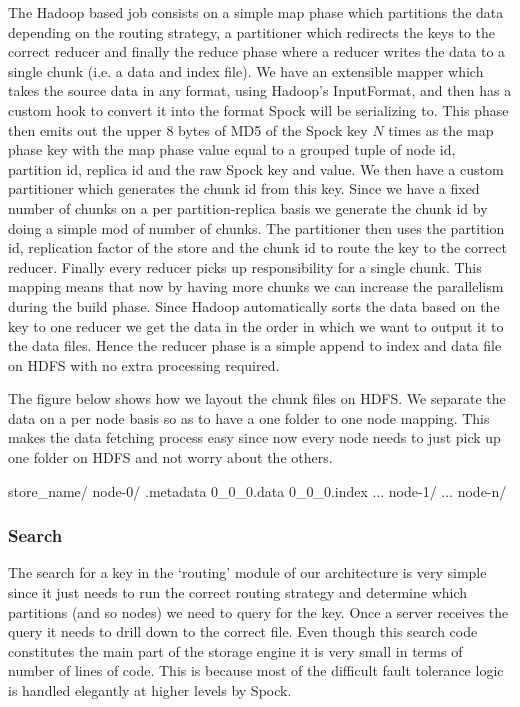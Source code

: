 \documentclass[twocolumn]{article}
\newcommand{\projectname}{Spock}
\begin{document}
The Hadoop based job consists on a simple map phase which partitions the data depending on the routing strategy, a partitioner which redirects the keys to the correct reducer and finally the reduce phase where a reducer writes the data to a single chunk (i.e. a data and index file). We have an extensible mapper which takes the source data in any format, using Hadoop's InputFormat, and then has a custom hook to convert it into the format \projectname{} will be serializing to. This phase then emits out the upper 8 bytes of MD5 of the \projectname{} key $N$ times as the map phase key with the map phase value equal to a grouped tuple of node id, partition id, replica id and the raw \projectname{} key and value. We then have a custom partitioner which generates the chunk id from this key. Since we have a fixed number of chunks on a per partition-replica basis we generate the chunk id by doing a simple mod of number of chunks. The partitioner then uses the partition id, replication factor of the store and the chunk id to route the key to the correct reducer. Finally every reducer picks up responsibility for a single chunk. This mapping means that now by having more chunks we can increase the parallelism during the build phase. Since Hadoop automatically sorts the data based on the key to one reducer we get the data in the order in which we want to output it to the data files. Hence the reducer phase is a simple append to index and data file on HDFS with no extra processing required.  

The figure below shows how we layout the chunk files on HDFS. We separate the data on a per node basis so as to have a one folder to one node mapping. This makes the data fetching process easy since now every node needs to just pick up one folder on HDFS and not worry about the others.

\scriptsize
\begin{verbatimtab}
store_name/
  node-0/
    .metadata
    0_0_0.data
    0_0_0.index
    ...
  node-1/
  ...
  node-n/
\end{verbatimtab}
\normalsize


\subsubsection{Search}
\label{sec:read_only:search}

The search for a key in the `routing' module of our architecture is very simple since it just needs to run the correct routing strategy and determine which partitions (and so nodes) we need to query for the key. Once a server receives the query it needs to drill down to the correct file. Even though this search code constitutes the main part of the storage engine it is very small in terms of number of lines of code. This is because most of the difficult fault tolerance logic is handled elegantly at higher levels by \projectname{}.
\end{document}

